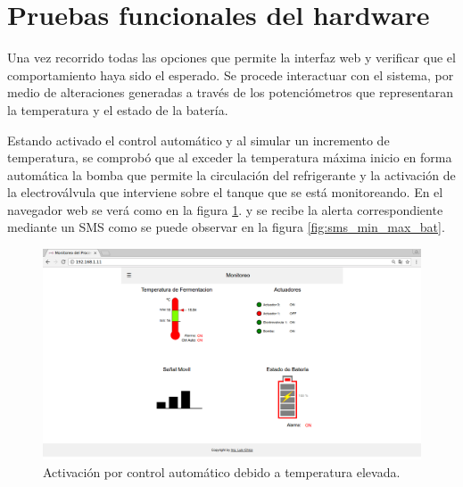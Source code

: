 \section{Pruebas funcionales del hardware}
\label{sec:pruebasHW}

Una vez recorrido todas las opciones que permite la interfaz web y verificar que el comportamiento haya sido el esperado. Se procede interactuar con el sistema, por medio de alteraciones generadas a través de los potenciómetros que representaran la temperatura y el estado de la batería.

Estando activado el control automático y al simular un incremento de temperatura, se comprobó que al exceder la temperatura máxima inicio en forma automática la bomba que permite la circulación del refrigerante y la activación de la electroválvula que interviene sobre el tanque que se está monitoreando. En el navegador web se verá como en la figura \ref{fig:auto_control_active}. y se recibe la alerta correspondiente mediante un SMS como se puede observar en la figura \ref{fig:sms_min_max_bat}.

\begin{figure}[h]
  \centering
  \includegraphics[scale=.25]{./Figures/auto_control_active.png}
  \caption{Activación por control automático debido a temperatura elevada.}
  \label{fig:auto_control_active}
\end{figure}


